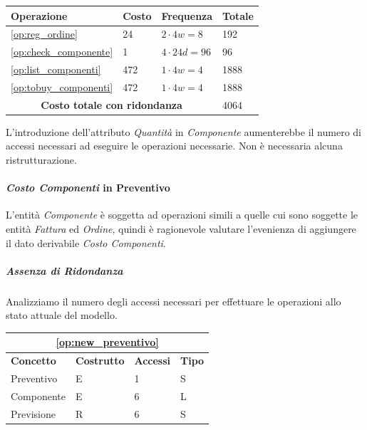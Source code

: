 					\begin{tabular}{| p{3cm} | p{3cm} | p{3cm} | p{3cm} |}
						\hline
						\textbf{Operazione} & \textbf{Costo} & \textbf{Frequenza} & \textbf{Totale} \\ \hline
						\ref{op:reg_ordine}			& 24	& $2 \cdot 4w = 8$		& 192 	\\
						\ref{op:check_componente}	& 1 	& $4 \cdot 24d = 96$	& 96	\\
						\ref{op:list_componenti}	& 472	& $1 \cdot 4w = 4$		& 1888	\\ 
						\ref{op:tobuy_componenti}	& 472	& $1 \cdot 4w = 4$		& 1888	\\
						\hline
						\multicolumn{3}{|c|}{\textbf{Costo totale con ridondanza}} & 4064 \\
						\hline
					\end{tabular}
					\vspace{2ex}

					L'introduzione dell'attributo \emph{Quantità} in \emph{Componente} aumenterebbe il numero di accessi necessari ad eseguire le operazioni necessarie. Non è necessaria alcuna ristrutturazione.

			\paragraph{\emph{Costo Componenti} in Preventivo}
				L'entità \emph{Componente} è soggetta ad operazioni simili a quelle cui sono soggette le entità \emph{Fattura} ed \emph{Ordine}, quindi è ragionevole valutare l'evenienza di aggiungere il dato derivabile \emph{Costo Componenti}.

				\subparagraph{Assenza di Ridondanza}
					Analizziamo il numero degli accessi necessari per effettuare le operazioni allo stato attuale del modello.

					\vspace{2ex}
					\begin{tabular}{| p{3cm} | p{3cm} | p{3cm} | p{3cm} |}
						\hline
						\multicolumn{4}{|c|}{\textbf{\ref{op:new_preventivo}}} \\ \hline
						\textbf{Concetto} & \textbf{Costrutto} & \textbf{Accessi} & \textbf{Tipo} \\ \hline
						Preventivo 		& E & 1 & S \\
						Componente 		& E & 6 & L \\
						Previsione		& R & 6 & S \\
						\hline
					\end{tabular}


